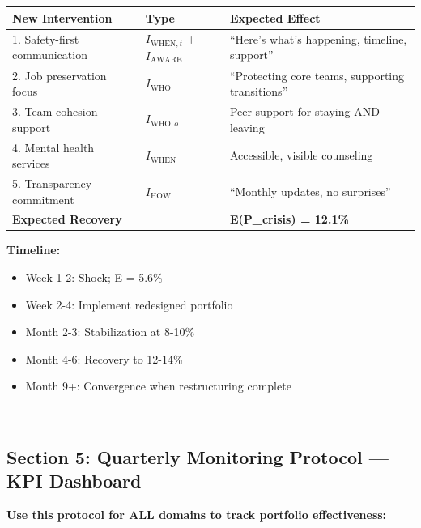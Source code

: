 \begin{center}
\begin{tabular}{@{}lll@{}}
\toprule
\textbf{New Intervention} & \textbf{Type} & \textbf{Expected Effect} \\
\midrule
1. Safety-first communication & $I_{\text{WHEN},t}$ + $I_{\text{AWARE}}$ & ``Here's what's happening, timeline, support'' \\
2. Job preservation focus & $I_{\text{WHO}}$ & ``Protecting core teams, supporting transitions'' \\
3. Team cohesion support & $I_{\text{WHO},o}$ & Peer support for staying AND leaving \\
4. Mental health services & $I_{\text{WHEN}}$ & Accessible, visible counseling \\
5. Transparency commitment & $I_{\text{HOW}}$ & ``Monthly updates, no surprises'' \\
\midrule
\textbf{Expected Recovery} & & \textbf{E(P\_crisis) = 12.1\%} \\
\midrule
\end{tabular}
\end{center}

\textbf{Timeline:}
\begin{itemize}[nosep]
\item Week 1-2: Shock; E = 5.6\%
\item Week 2-4: Implement redesigned portfolio
\item Month 2-3: Stabilization at 8-10\%
\item Month 4-6: Recovery to 12-14\%
\item Month 9+: Convergence when restructuring complete
\end{itemize}

---


\subsection*{Section 5: Quarterly Monitoring Protocol — KPI Dashboard}

\textbf{Use this protocol for ALL domains to track portfolio effectiveness:}

